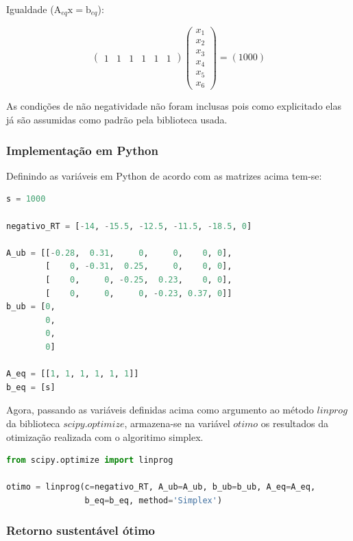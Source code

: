 \documentclass[a4paper, 12pt]{article}
\begin{document}
Igualdade ($\mathrm{A_{\mathit{eq}}\mathrm{x\mathit{= \mathrm{b\mathit{_{eq}}}}}}$):

$$\begin{pmatrix}
1&1&1&1&1&1
\end{pmatrix}\begin{pmatrix}
x_1\\
x_2\\
x_3\\
x_4\\
x_5\\
x_6
\end{pmatrix}=\left(1000\right)$$

As condições de não negatividade não foram inclusas pois como explicitado elas já são assumidas como padrão pela biblioteca usada.

\subsubsection{Implementação em Python}

Definindo as variáveis em Python de acordo com as matrizes acima tem-se:

\begin{lstlisting}[language=Python, caption=Simplex: definindo as matrizes, label=listing_simplex_definindo as matrizes]
s = 1000

negativo_RT = [-14, -15.5, -12.5, -11.5, -18.5, 0]

A_ub = [[-0.28,  0.31,     0,     0,    0, 0],
        [    0, -0.31,  0.25,     0,    0, 0],
        [    0,     0, -0.25,  0.23,    0, 0],
        [    0,     0,     0, -0.23, 0.37, 0]]
b_ub = [0,
        0,
        0,
        0]

A_eq = [[1, 1, 1, 1, 1, 1]]
b_eq = [s]
\end{lstlisting}

Agora, passando as variáveis definidas acima como argumento ao método $linprog$ da biblioteca $scipy.optimize$, armazena-se na variável $otimo$ os resultados da otimização realizada com o algoritimo simplex.

\begin{lstlisting}[language=Python, caption=Simplex: otimizando, label=listing_simplex_otimizando]
from scipy.optimize import linprog

otimo = linprog(c=negativo_RT, A_ub=A_ub, b_ub=b_ub, A_eq=A_eq, 
                b_eq=b_eq, method='Simplex')
\end{lstlisting}

\subsubsection{Retorno sustentável ótimo}
\end{document}
